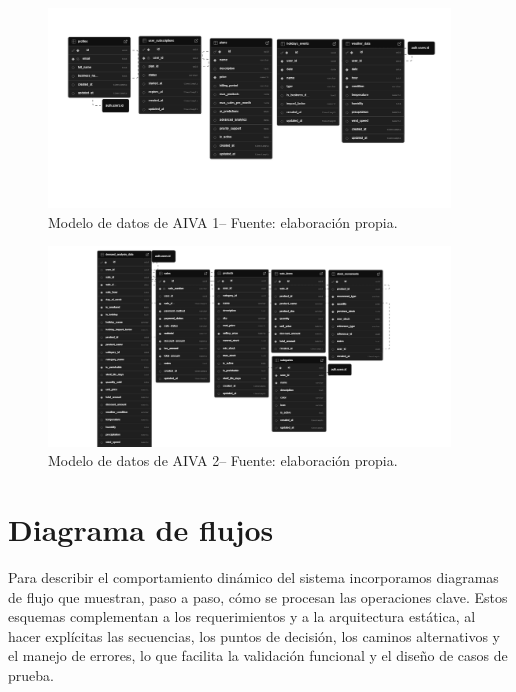 \begin{figure}[!htbp]
  \centering
  \includegraphics[width=0.95\textwidth]{images/ArquitecturaDB1.png} %
  \caption{Modelo de datos de AIVA 1-- Fuente: elaboración propia.}
  \label{fig:arquitectura-db}
\end{figure}
\vspace{1cm}

\begin{figure}[!htbp]
    \centering
    \includegraphics[width=0.95\textwidth]{images/ArquitecturaDB2.png} %
    \caption{Modelo de datos de AIVA 2-- Fuente: elaboración propia.}
    \label{fig:arquitectura-db2}
  \end{figure}
  \vspace{2cm}


\vspace{1cm}
\section{Diagrama de flujos}

Para describir el comportamiento dinámico del sistema incorporamos diagramas de flujo que muestran, paso a paso, cómo se procesan las operaciones clave. Estos esquemas complementan a los requerimientos y a la arquitectura estática, al hacer explícitas las secuencias, los puntos de decisión, los caminos alternativos y el manejo de errores, lo que facilita la validación funcional y el diseño de casos de prueba.


